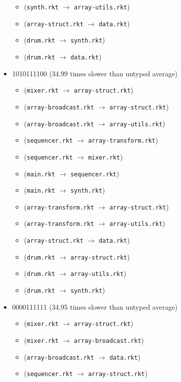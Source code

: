 \documentclass{article}
\newcommand{\mono}[1]{\texttt{#1}}
\begin{document}
\begin{itemize}
\begin{itemize}
  \item (\mono{synth.rkt} $\rightarrow$ \mono{array-utils.rkt})
  \item (\mono{array-struct.rkt} $\rightarrow$ \mono{data.rkt})
  \item (\mono{drum.rkt} $\rightarrow$ \mono{synth.rkt})
  \item (\mono{drum.rkt} $\rightarrow$ \mono{data.rkt})
  \end{itemize}
\item 1010111100 (34.99 times slower than untyped average)
  \begin{itemize}
  \item (\mono{mixer.rkt} $\rightarrow$ \mono{array-struct.rkt})
  \item (\mono{array-broadcast.rkt} $\rightarrow$ \mono{array-struct.rkt})
  \item (\mono{array-broadcast.rkt} $\rightarrow$ \mono{array-utils.rkt})
  \item (\mono{sequencer.rkt} $\rightarrow$ \mono{array-transform.rkt})
  \item (\mono{sequencer.rkt} $\rightarrow$ \mono{mixer.rkt})
  \item (\mono{main.rkt} $\rightarrow$ \mono{sequencer.rkt})
  \item (\mono{main.rkt} $\rightarrow$ \mono{synth.rkt})
  \item (\mono{array-transform.rkt} $\rightarrow$ \mono{array-struct.rkt})
  \item (\mono{array-transform.rkt} $\rightarrow$ \mono{array-utils.rkt})
  \item (\mono{array-struct.rkt} $\rightarrow$ \mono{data.rkt})
  \item (\mono{drum.rkt} $\rightarrow$ \mono{array-struct.rkt})
  \item (\mono{drum.rkt} $\rightarrow$ \mono{array-utils.rkt})
  \item (\mono{drum.rkt} $\rightarrow$ \mono{synth.rkt})
  \end{itemize}
\item 0000111111 (34.95 times slower than untyped average)
  \begin{itemize}
  \item (\mono{mixer.rkt} $\rightarrow$ \mono{array-struct.rkt})
  \item (\mono{mixer.rkt} $\rightarrow$ \mono{array-broadcast.rkt})
  \item (\mono{array-broadcast.rkt} $\rightarrow$ \mono{data.rkt})
  \item (\mono{sequencer.rkt} $\rightarrow$ \mono{array-struct.rkt})

\end{itemize}
\end{itemize}
\end{document}
